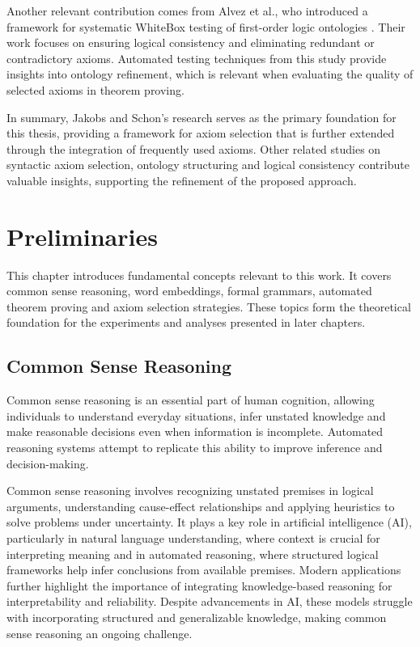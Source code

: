 \documentclass[english,version-2020-11]{uzl-thesis}
\begin{document}
Another relevant contribution comes from Alvez et al., who introduced a framework for systematic WhiteBox testing of first-order logic ontologies \cite{Alvez2017}. Their work focuses on ensuring logical consistency and eliminating redundant or contradictory axioms. Automated testing techniques from this study provide insights into ontology refinement, which is relevant when evaluating the quality of selected axioms in theorem proving.

In summary, Jakobs and Schon's research serves as the primary foundation for this thesis, providing a framework for axiom selection that is further extended through the integration of frequently used axioms. Other related studies on syntactic axiom selection, ontology structuring and logical consistency contribute valuable insights, supporting the refinement of the proposed approach.


\chapter{Preliminaries}
\label{chapter-preliminaries}

This chapter introduces fundamental concepts relevant to this work. It covers common sense reasoning, word embeddings, formal grammars, automated theorem proving and axiom selection strategies. These topics form the theoretical foundation for the experiments and analyses presented in later chapters.

\section{Common Sense Reasoning}

Common sense reasoning is an essential part of human cognition, allowing individuals to understand everyday situations, infer unstated knowledge and make reasonable decisions even when information is incomplete. Automated reasoning systems attempt to replicate this ability to improve inference and decision-making.

Common sense reasoning involves recognizing unstated premises in logical arguments, understanding cause-effect relationships and applying heuristics to solve problems under uncertainty. It plays a key role in artificial intelligence (AI), particularly in natural language understanding, where context is crucial for interpreting meaning and in automated reasoning, where structured logical frameworks help infer conclusions from available premises. Modern applications further highlight the importance of integrating knowledge-based reasoning for interpretability and reliability. Despite advancements in AI, these models struggle with incorporating structured and generalizable knowledge, making common sense reasoning an ongoing challenge.
\end{document}
